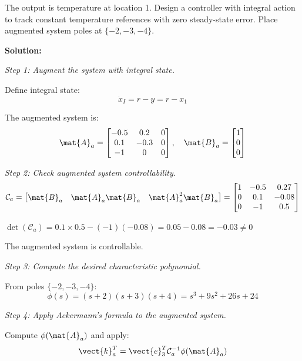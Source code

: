The output is temperature at location 1. Design a controller with integral action to track constant temperature references with zero steady-state error. Place augmented system poles at $\{-2, -3, -4\}$.

\textbf{Solution:}

\textit{Step 1: Augment the system with integral state.}

Define integral state:
\begin{equation}
\dot{x}_I = r - y = r - x_1
\end{equation}

The augmented system is:
\begin{equation}
\mat{A}_a = \begin{bmatrix} -0.5 & 0.2 & 0 \\ 0.1 & -0.3 & 0 \\ -1 & 0 & 0 \end{bmatrix}, \quad
\mat{B}_a = \begin{bmatrix} 1 \\ 0 \\ 0 \end{bmatrix}
\end{equation}

\textit{Step 2: Check augmented system controllability.}
\begin{equation}
\mathcal{C}_a = \begin{bmatrix} \mat{B}_a & \mat{A}_a\mat{B}_a & \mat{A}_a^2\mat{B}_a \end{bmatrix}
= \begin{bmatrix} 1 & -0.5 & 0.27 \\ 0 & 0.1 & -0.08 \\ 0 & -1 & 0.5 \end{bmatrix}
\end{equation}

$\det(\mathcal{C}_a) = 0.1 \times 0.5 - (-1)(-0.08) = 0.05 - 0.08 = -0.03 \neq 0$

The augmented system is controllable.

\textit{Step 3: Compute the desired characteristic polynomial.}

From poles $\{-2, -3, -4\}$:
\begin{equation}
\phi(s) = (s+2)(s+3)(s+4) = s^3 + 9s^2 + 26s + 24
\end{equation}

\textit{Step 4: Apply Ackermann's formula to the augmented system.}

Compute $\phi(\mat{A}_a)$ and apply:
\begin{equation}
\vect{k}_a^T = \vect{e}_3^T\mathcal{C}_a^{-1}\phi(\mat{A}_a)
\end{equation}

